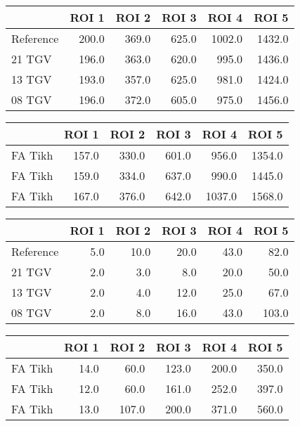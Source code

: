 \begin{tabular}{lrrrrr}
\toprule
{} &  ROI 1 &  ROI 2 &  ROI 3 &   ROI 4 &   ROI 5 \\
\midrule
Reference &  200.0 &  369.0 &  625.0 &  1002.0 &  1432.0 \\
21 TGV    &  196.0 &  363.0 &  620.0 &   995.0 &  1436.0 \\
13 TGV    &  193.0 &  357.0 &  625.0 &   981.0 &  1424.0 \\
08 TGV    &  196.0 &  372.0 &  605.0 &   975.0 &  1456.0 \\
\bottomrule
\end{tabular}
\begin{tabular}{lrrrrr}
\toprule
{} &  ROI 1 &  ROI 2 &  ROI 3 &   ROI 4 &   ROI 5 \\
\midrule
FA Tikh &  157.0 &  330.0 &  601.0 &   956.0 &  1354.0 \\
FA Tikh &  159.0 &  334.0 &  637.0 &   990.0 &  1445.0 \\
FA Tikh &  167.0 &  376.0 &  642.0 &  1037.0 &  1568.0 \\
\bottomrule
\end{tabular}
\begin{tabular}{lrrrrr}
\toprule
{} &  ROI 1 &  ROI 2 &  ROI 3 &  ROI 4 &  ROI 5 \\
\midrule
Reference &    5.0 &   10.0 &   20.0 &   43.0 &   82.0 \\
21 TGV    &    2.0 &    3.0 &    8.0 &   20.0 &   50.0 \\
13 TGV    &    2.0 &    4.0 &   12.0 &   25.0 &   67.0 \\
08 TGV    &    2.0 &    8.0 &   16.0 &   43.0 &  103.0 \\
\bottomrule
\end{tabular}
\begin{tabular}{lrrrrr}
\toprule
{} &  ROI 1 &  ROI 2 &  ROI 3 &  ROI 4 &  ROI 5 \\
\midrule
FA Tikh &   14.0 &   60.0 &  123.0 &  200.0 &  350.0 \\
FA Tikh &   12.0 &   60.0 &  161.0 &  252.0 &  397.0 \\
FA Tikh &   13.0 &  107.0 &  200.0 &  371.0 &  560.0 \\
\bottomrule
\end{tabular}
